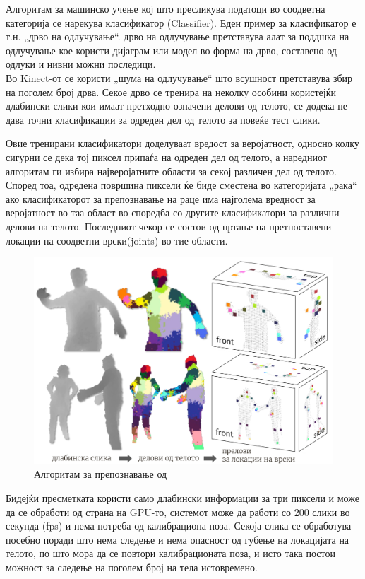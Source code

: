 \documentclass[12pt]{article}
\begin{document}
  Алгоритам за машинско учење кој што пресликува податоци во соодветна категорија се нарекува класификатор (Classifier). Еден пример за класификатор е т.н. „дрво на одлучување“. дрво на одлучување претставува алат за поддшка на одлучување кое користи дијаграм или модел во форма на дрво, составено од одлуки и нивни можни последици.\\
  Во Kinect-от се користи „шума на одлучување“ што всушност претставува збир на поголем број дрва. Секое дрво се тренира на неколку особини користејќи длабински слики кои имаат претходно означени делови од телото, се додека не дава точни класификации за одреден дел од телото за повеќе тест слики.

  Овие тренирани класификатори доделуваат вредост за веројатност, односно колку сигурни се дека тој пиксел припаѓа на одреден дел од телото, а наредниот алгоритам ги избира најверојатните области за секој различен дел од телото. Според тоа, одредена површина пиксели ќе биде сместена во категоријата „рака“ ако класификаторот за препознавање на раце има најголема вредност за веројатност во таа област во споредба со другите класификатори за различни делови на телото. Последниот чекор се состои од цртање на претпоставени локации на соодветни врски(joints) во тие области.

  \begin{figure}[H]
    \includegraphics[width=0.75\linewidth]{./images/bodyparts.png}
    \centering
    \caption{Алгоритам за препознавање од \cite{machinelearning}}
    \label{fig:bodyparts.png}
    \end{figure}

  Бидејќи пресметката користи само длабински информации за три пиксели и може да се обработи од страна на GPU-то, системот може да работи со 200 слики во секунда (fps) и нема потреба од калибрациона поза. Секоја слика се обработува посебно поради што нема следење и нема опасност од губење на локацијата на телото, по што мора да се повтори калибрационата поза, и исто така постои можност за следење на поголем број на тела истовремено.
\end{document}
